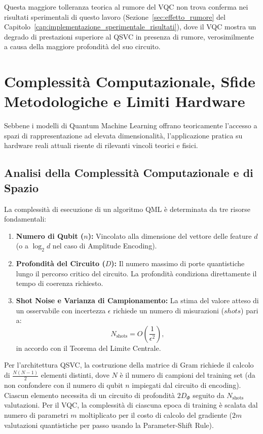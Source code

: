 Questa maggiore tolleranza teorica al rumore del VQC non trova conferma nei risultati sperimentali di questo lavoro (Sezione~\ref{sec:effetto_rumore} del Capitolo~\ref{cap:implementazione_sperimentale_risultati}), dove il VQC mostra un degrado di prestazioni superiore al QSVC in presenza di rumore, verosimilmente a causa della maggiore profondità del suo circuito.

\section{Complessità Computazionale, Sfide Metodologiche e Limiti Hardware}
\label{sec:sfide_e_limiti}

Sebbene i modelli di Quantum Machine Learning offrano teoricamente l'accesso a spazi di rappresentazione ad elevata dimensionalità, l'applicazione pratica su hardware reali attuali risente di rilevanti vincoli teorici e fisici.

\subsection{Analisi della Complessità Computazionale e di Spazio}
\label{sec:complessita_qml}
La complessità di esecuzione di un algoritmo QML è determinata da tre risorse fondamentali:
\begin{enumerate}
    \item \textbf{Numero di Qubit ($n$):} Vincolato alla dimensione del vettore delle feature $d$ (o a $\log_2 d$ nel caso di Amplitude Encoding).
    \item \textbf{Profondità del Circuito ($D$):} Il numero massimo di porte quantistiche lungo il percorso critico del circuito. La profondità condiziona direttamente il tempo di coerenza richiesto.
    \item \textbf{Shot Noise e Varianza di Campionamento:} La stima del valore atteso di un osservabile con incertezza $\epsilon$ richiede un numero di misurazioni ($shots$) pari a:
    \begin{equation}
    N_{\text{shots}} = O\left(\frac{1}{\epsilon^2}\right),
    \end{equation}
    in accordo con il Teorema del Limite Centrale.
\end{enumerate}

Per l'architettura QSVC, la costruzione della matrice di Gram richiede il calcolo di $\frac{N(N-1)}{2}$ elementi distinti, dove $N$ è il numero di campioni del training set (da non confondere con il numero di qubit $n$ impiegati dal circuito di encoding). Ciascun elemento necessita di un circuito di profondità $2 D_{\Phi}$ seguito da $N_{\text{shots}}$ valutazioni. Per il VQC, la complessità di ciascuna epoca di training è scalata dal numero di parametri $m$ moltiplicato per il costo di calcolo del gradiente ($2m$ valutazioni quantistiche per passo usando la Parameter-Shift Rule).

